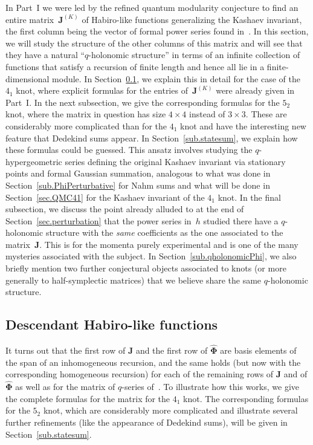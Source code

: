 \documentclass[pdftex]{sigma}
\numberwithin{equation}{section}
\def\Phih{\widehat\Phi}
\def\bJ{J} \def\bJ{\mathbf{J}}
\def\bPhih{\mathbf{\Phih}}
\begin{document}
In Part~I we were led by the refined quantum modularity conjecture to find an entire
matrix~$\bJ^{(K)}$ of Habiro-like functions generalizing the Kashaev invariant, the
first column being the vector of formal power series found in~\cite{DG,DG2}.
In this section, we will study the structure of the other columns of this matrix and
will see that they have a natural ``$q$-holonomic structure'' in terms of an infinite
collection of functions that satisfy a recursion of finite length and hence all lie
in a finite-dimensional module. In Section~\ref{sub.qholo}, we explain this in detail
for the case of the~$4_1$ knot, where explicit formulas for the entries of~$\bJ^{(K)}$
were already given in Part~I. In the next subsection, we give the corresponding
formulas for the $5_2$ knot, where the matrix in question has size $4\times4$
instead of $3\times3$.
These are considerably more complicated than for the $4_1$ knot and have the interesting
new feature that Dedekind sums appear. In Section~\ref{sub.statesum},
we explain how these formulas could be guessed. This ansatz involves studying
the $q$-hypergeometric series defining the original Kashaev invariant via stationary
points and formal Gaussian summation, analogous to what was done in
Section~\ref{sub.PhiPerturbative} for Nahm sums and what will be done in
Section~\ref{sec.QMC41} for the Kashaev invariant of the $4_1$ knot. In the final
subsection, we discuss the point already alluded to at the end of
Section~\ref{sec.perturbation} that the power series in~$h$ studied there have a
$q$-holonomic structure with the \emph{same} coefficients as the one associated to
the matrix~$\bJ$. This is for the momenta purely experimental and is one of the many
mysteries associated with the subject. In Section~\ref{sub.qholonomicPhi}, we also
briefly mention two further conjectural objects associated to knots (or more generally
to half-symplectic matrices) that we believe share the same $q$-holonomic structure.

\subsection{Descendant Habiro-like functions}\label{sub.qholo}

It turns out that the first row of $\bJ$ and the first row of $\bPhih$ are basis
elements of the span of an inhomogeneous recursion, and the same holds (but now with
the corresponding homogeneous recursion) for each of the remaining rows of $\bJ$ and
of $\bPhih$ as well as for the matrix of $q$-series of~\cite{GZ:qseries}. To illustrate how this works, we give the complete formulas
for the matrix for the $4_1$ knot. The corresponding formulas for the $5_2$ knot, which
are considerably more complicated and illustrate several further refinements (like the
appearance of Dedekind sums), will be given in Section~\ref{sub.statesum}.
\end{document}
